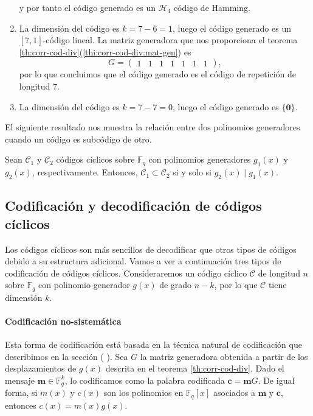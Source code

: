 \begin{example}
\begin{enumerate}
\[    \]
    y por tanto el código generado es un \(\mathcal H_4\) código de Hamming.
    \item La dimensión del código es \(k = 7 - 6 = 1\), luego el código generado es un \([7, 1]\)-código lineal.
    La matriz generadora que nos proporciona el teorema \ref{th:corr-cod-div}(\ref{thi:corr-cod-div:mat-gen}) es \[
      G = \left(\begin{array}{rrrrrrr}
        1 & 1 & 1 & 1 & 1 & 1 & 1
        \end{array}\right),
    \] por lo que concluimos que el código generado es el código de repetición de longitud \(7\).
    \item La dimensión del código es \(k = 7 - 7 = 0\), luego el código generado es \(\{\mathbf 0\}\).
  \end{enumerate}
\end{example}


El siguiente resultado nos muestra la relación entre dos polinomios generadores cuando un código es subcódigo de otro.

\begin{corollary}
  Sean \(\mathcal C_1\) y \(\mathcal C_2\) códigos cíclicos sobre \(\mathbb F_q\) con polinomios generadores \(g_1(x)\) y \(g_2(x)\), respectivamente.
  Entonces, \(\mathcal C_1 \subset \mathcal C_2 \) si y solo si \(g_2(x) \mid g_1(x)\).
\end{corollary}


\subsection{Codificación y decodificación de códigos cíclicos}

Los códigos cíclicos son más sencillos de decodificar que otros tipos de códigos debido a su estructura adicional.
Vamos a ver a continuación tres tipos de codificación de códigos cíclicos.
Consideraremos un código cíclico \(\mathcal C\) de longitud \(n\) sobre \(\mathbb F_q\) con polinomio generador \(g(x)\) de grado \(n - k\), por lo que \(\mathcal C\) tiene dimensión \(k\).

\paragraph{Codificación no-sistemática}

Esta forma de codificación está basada en la técnica natural de codificación que describimos en la sección (
).
Sea \(G\) la matriz generadora obtenida a partir de los desplazamientos de \(g(x)\) descrita en el teorema \ref{th:corr-cod-div}.
Dado el mensaje \(\mathbf m \in \mathbb F_q^k\), lo codificamos como la palabra codificada \(\mathbf c = \mathbf mG\).
De igual forma, si \(m(x)\) y \(c(x)\) son los polinomios en \(\mathbb F_q[x]\) asociados a \(\mathbf{m}\) y \(\mathbf c\), entonces \(c(x) = m(x)g(x)\).


